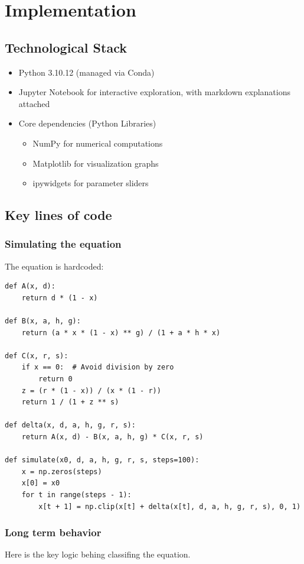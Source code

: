 \documentclass[a4paper, 10pt]{article}
\begin{document}
\clearpage
\section{Implementation}
\subsection{Technological Stack}
\begin{itemize}
	\item Python 3.10.12 (managed via Conda)
	\item Jupyter Notebook for interactive exploration, with markdown explanations attached
	\item Core dependencies (Python Libraries)
	      \begin{itemize}
		      \item NumPy for numerical computations
		      \item Matplotlib for visualization graphs
		      \item ipywidgets for parameter sliders
	      \end{itemize}
\end{itemize}

\subsection{Key lines of code}
\subsubsection{Simulating the equation}
The equation is hardcoded:
\begin{verbatim}
def A(x, d):
    return d * (1 - x)

def B(x, a, h, g):
    return (a * x * (1 - x) ** g) / (1 + a * h * x)

def C(x, r, s):
    if x == 0:  # Avoid division by zero
        return 0
    z = (r * (1 - x)) / (x * (1 - r))
    return 1 / (1 + z ** s)

def delta(x, d, a, h, g, r, s):
    return A(x, d) - B(x, a, h, g) * C(x, r, s)

def simulate(x0, d, a, h, g, r, s, steps=100):
    x = np.zeros(steps)
    x[0] = x0
    for t in range(steps - 1):
        x[t + 1] = np.clip(x[t] + delta(x[t], d, a, h, g, r, s), 0, 1)
\end{verbatim}
\vspace{-3em}
\subsubsection{Long term behavior}
Here is the key logic behing classifing the equation.
\end{document}
